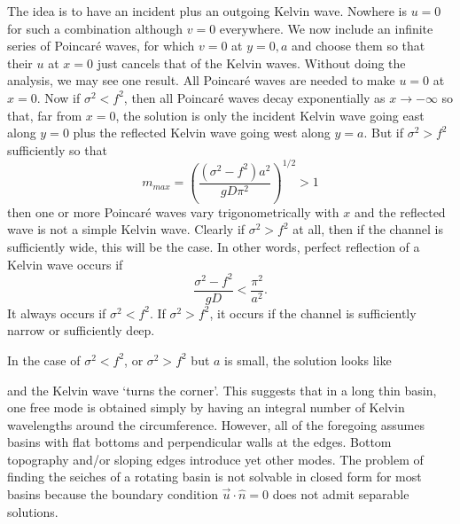 
\wavefiguremark

The idea is to have an incident plus an outgoing Kelvin wave. Nowhere is $u=0$ for
such a combination although $v=0$ everywhere. We now include an infinite series of
Poincaré waves, for which $v=0$ at $y=0,a$ and choose them so that their $u$ at
$x=0$ just cancels that of the Kelvin waves. Without doing the analysis, we may see
one result. All Poincaré waves are needed to make $u=0$ at $x=0$. Now if
$\sigma^2<f^2$, then all Poincaré waves decay exponentially as $x\to-\infty$ so
that, far from $x=0$, the solution is only the incident Kelvin wave going east along
$y=0$ plus the reflected Kelvin wave going west along $y=a$. But if $\sigma^2>f^2$
sufficiently so that
\[
	m_{max}=\left(\frac{(\sigma^2-f^2)a^2}{gD\pi^2}\right)^{1/2}>1
\]
then one or more Poincaré waves vary trigonometrically with $x$ and the reflected wave
is not a simple Kelvin wave. Clearly if $\sigma^2>f^2$ at all, then if the channel is
sufficiently wide, this will be the case. In other words, perfect reflection of a Kelvin
wave occurs if
\[
	\frac{\sigma^2-f^2}{gD}<\frac{\pi^2}{a^2}.
\]
It always occurs if $\sigma^2<f^2$. If $\sigma^2>f^2$, it occurs if the channel is
sufficiently narrow or sufficiently deep.

In the case of $\sigma^2<f^2$, or $\sigma^2>f^2$ but $a$ is small, the solution looks
like

\sourcepagebreak


and the Kelvin wave `turns the corner'. This suggests that in a long thin basin, one
free mode is obtained simply by having an integral number of Kelvin wavelengths
around the circumference. However, all of the foregoing assumes basins with flat
bottoms and perpendicular walls at the edges. Bottom topography and/or sloping edges
introduce yet other modes. The problem of finding the seiches of a rotating basin is
not solvable in closed form for most basins because the boundary condition
$\vec u\cdot\hat n=0$ does not admit separable solutions.

